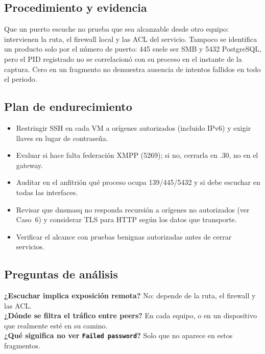 \subsection{Procedimiento y evidencia}

Que un puerto escuche no prueba que sea alcanzable desde otro equipo: intervienen la ruta, el firewall local y las ACL del servicio. Tampoco se identifica un producto solo por el número de puerto: 445 suele ser SMB y 5432 PostgreSQL, pero el PID registrado no se correlacionó con su proceso en el instante de la captura. Cero  en un fragmento no demuestra ausencia de intentos fallidos en todo el periodo.

\subsection{Plan de endurecimiento}
\begin{itemize}
\item Restringir SSH en cada VM a orígenes autorizados (incluido IPv6) y exigir llaves en lugar de contraseña.
\item Evaluar si hace falta federación XMPP (5269); si no, cerrarla en .30, no en el gateway.
\item Auditar en el anfitrión qué proceso ocupa 139/445/5432 y si debe escuchar en todas las interfaces.
\item Revisar que dnsmasq no responda recursión a orígenes no autorizados (ver Caso~6) y considerar TLS para HTTP según los datos que transporte.
\item Verificar el alcance con pruebas benignas autorizadas antes de cerrar servicios.
\end{itemize}

\subsection{Preguntas de análisis}
\textbf{¿Escuchar implica exposición remota?} No: depende de la ruta, el firewall y las ACL.\\
\textbf{¿Dónde se filtra el tráfico entre peers?} En cada equipo, o en un dispositivo que realmente esté en su camino.\\
\textbf{¿Qué significa no ver \texttt{Failed password}?} Solo que no aparece en estos fragmentos.

